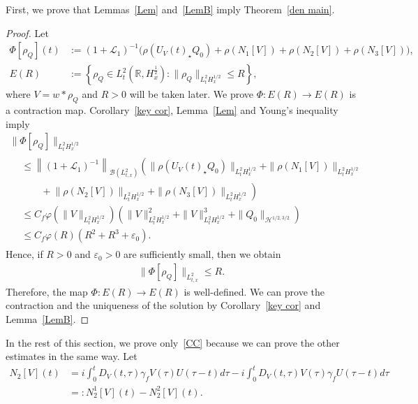 \documentclass[10pt,a4paper]{amsart}
\newcommand{\CB}{\mathcal{B}}
\newcommand{\CH}{\mathcal{H}}
\newcommand{\CL}{\mathcal{L}}
\newcommand{\ga}{\gamma}
\newcommand{\ep}{\varepsilon}
\newcommand{\ph}{\varphi}
\newcommand{\ta}{\tau}
\newcommand{\rh}{\rho}
\newcommand{\Ph}{\Phi}
\newcommand{\K}[1]{\left(#1\right)}
\newcommand{\st}{\star}
\newcommand{\R}{\mathbb{R}}
\newcommand{\tw}{\frac{1}{2}}
\begin{document}
First, we prove that Lemmas~\ref{Lem} and~\ref{LemB} imply Theorem~\ref{den main}.
\begin{proof}
Let
\begin{align}
\Ph[\rh_Q](t)&:= (1+\CL_1)^{-1} \big(\rh(U_V(t)_\st Q_0) + \rh(N_1[V])+ \rh(N_2[V])+ \rh(N_3[V])\big), \\
E(R)&:= \left\{\rh_Q \in L^2_t\left(\R,H^\tw_x\right) : \|\rh_Q\|_{L^2_t H^{1/2}_x} \leq R\right\},
\end{align}
where $V = w \ast \rh_Q$ and $R>0$ will be taken later. We prove $\Ph:E(R) \to E(R)$ is a contraction map. Corollary~\ref{key cor}, Lemma~\ref{Lem} and Young's inequality imply
\begin{multline}
\| \Ph[\rh_Q] \|_{L^2_t H^{1/2}_x}\\
\begin{aligned}
&\leq \left\|(1+\CL_1)^{-1}\right\|_{\CB\left(L^2_{t,x}\right)}
\left(\|\rh(U_V(t)_\st Q_0)\|_{L^2_t H^{1/2}_x} + \|\rh(N_1[V])\|_{L^2_t H^{1/2}_x} \right.\\
&\qquad +\left. \|\rh(N_2[V])\|_{L^2_t H^{1/2}_x} + \|\rh(N_3[V])\|_{L^2_t H^{1/2}_x}
\right)\\
& \le C_f \ph\left(\|V\|_{L^2_t H^{1/2}_x}\right)
\K{\|V\|_{L^2_t H^{1/2}_x}^2 + \|V\|_{L^2_t H^{1/2}_x}^3 + \|Q_0\|_{\CH^{1/2,3/2}} } \\
& \le C_f \ph(R)\left(R^2 + R^3 + \ep_0\right).
\end{aligned}
\end{multline}
Hence, if $R >0$ and $\ep_0 >0$ are sufficiently small, then we obtain
\begin{align}
\| \Ph[\rh_Q] \|_{L^2_{t,x}} \leq R.
\end{align}
Therefore, the map $\Ph:E(R) \to E(R)$ is well-defined. We can prove the contraction and the uniqueness of the solution by Corollary~\ref{key cor} and Lemma~\ref{LemB}.
\end{proof}

In the rest of this section, we prove only~\eqref{CC} because we can prove the other estimates in the same way. Let
\begin{equation}\label{C1 C2}
\begin{split}
N_2[V](t) &= i \int_0^t D_V(t,\ta) \ga_f V(\ta) U(\ta-t)d\ta-i\int_0^t D_V(t,\ta) V(\ta) \ga_f U(\ta-t)d\ta \\
&=:N_2^1[V](t) - N_2^2[V](t). 
\end{split}
\end{equation}
\end{document}

